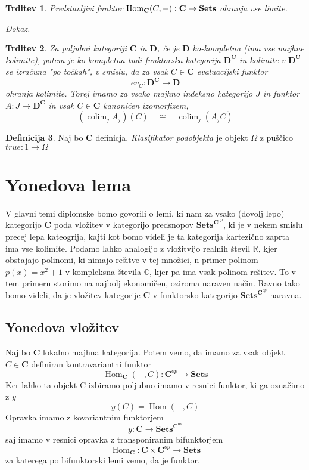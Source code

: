 \documentclass[12pt,a4paper]{book}
\theoremstyle{definition}
\newtheorem{definicija}{Definicija}[chapter]
\theoremstyle{plain}
\newtheorem{trditev}[definicija]{Trditev}
\newenvironment{dokaz}{\emph{Dokaz.}\ }{\hspace{\fill}{$\Box$}}
\theoremstyle{definition}
\theoremstyle{remark}
\newcommand{\cat}[1]{\textbf{#1}}
\DeclareMathOperator{\Hom}{Hom}
\DeclareMathOperator{\colim}{colim}
\newcommand{\predsnop}[1]{\cat{Sets}^{\cat{#1}^{op}}}
\begin{document}
\begin{trditev} Predstavljivi funktor $\Hom_{\bf{C}}(C,-): \bf{C} \to \bf{Sets}$ ohranja vse limite.
\end{trditev}
\begin{dokaz}

\end{dokaz}

\begin{trditev}
Za poljubni kategoriji $\cat{C}$ in $\cat{D}$, če je $\cat{D}$ ko-kompletna (ima vse majhne kolimite), potem je ko-kompletna tudi funktorska kategorija $\cat{D}^{\cat{C}}$ in kolimite v $\cat{D}^{\cat{C}}$ se izračuna "po točkah", v smislu, da za vsak $C \in \cat{C}$ evaluacijski funktor
$$ev_C : \cat{D}^{\cat{C}} \to \cat{D}$$
ohranja kolimite. Torej imamo za vsako majhno indeksno kategorijo $J$ in funktor $A : J \to \cat{D}^{\cat{C}}$ in vsak $C \in \cat{C}$ kanoničen izomorfizem,
$$(\colim_j A_j)(C) \quad \cong \quad \colim_j (A_jC)$$
\end{trditev}

\begin{definicija}
Naj bo \textbf{C} definicja. \textit{Klasifikator podobjekta} je objekt $\Omega$ z puščico $true: 1 \to \Omega$
\end{definicija}


\chapter{Yonedova lema}

V glavni temi diplomske bomo govorili o lemi, ki nam za vsako (dovolj lepo) kategorijo $\cat{C}$ poda vložitev v kategorijo predsnopov $\predsnop{C}$, ki je v nekem smislu precej lepa kateogrija, kajti kot bomo videli je ta kategorija kartezično zaprta ima vse kolimite.
Podamo lahko analogijo z vložitvijo realnih števil $\mathbb{R}$, kjer obstajajo polinomi, ki nimajo rešitve v tej množici, n primer polinom $p(x) = x^2 + 1$ v kompleksna števila $\mathbb{C}$, kjer pa ima vsak polinom rešitev. To v tem primeru storimo na najbolj ekonomičen, oziroma naraven način. Ravno tako bomo videli, da je vložitev kategorije $\cat{C}$ v funktorsko kategorijo $\predsnop{C}$ naravna.

\section{Yonedova vložitev}

Naj bo $\mathbf{C}$ lokalno majhna kategorija.
Potem vemo, da imamo za vsak objekt $C \in \cat{C}$ definiran kontravariantni funktor 
$$\Hom_{\cat{C}}(-,C) : \cat{C}^{op} \to \cat{Sets}$$
Ker lahko ta objekt C izbiramo poljubno imamo v resnici funktor, ki ga označimo z $y$
$$y(C) = \Hom(-,C) $$
Opravka imamo z kovariantnim funktorjem 
$$y : \mathbf{C} \to \mathbf{Sets}^{\cat{C}^{op}}$$
saj imamo v resnici opravka z transponiranim bifunktorjem
$$\Hom_{\cat{C}} : \cat{C} \times \cat{C}^{op} \to \cat{Sets}$$
za katerega po bifunktorski lemi vemo, da je funktor.
\end{document}
